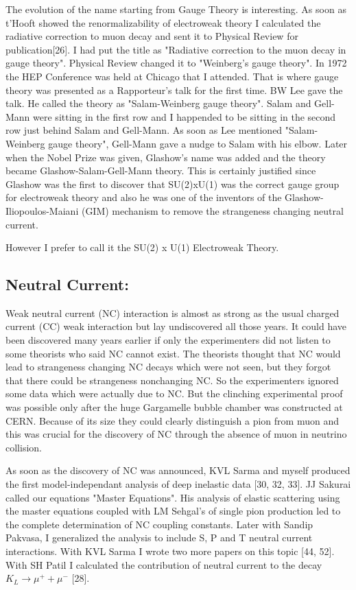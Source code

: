 The evolution of the name starting from Gauge Theory is interesting. As 
soon as t'Hooft showed the renormalizability of electroweak theory I 
calculated the radiative correction to muon decay and sent it to 
Physical Review for publication[26]. I had put the title as "Radiative 
correction to the muon decay in gauge theory". Physical Review changed 
it to "Weinberg's gauge theory". In 1972 the HEP Conference was held at 
Chicago that I attended. That is where gauge theory was presented as a 
Rapporteur's talk for the first time. BW Lee gave the talk. He called 
the theory as "Salam-Weinberg gauge theory". Salam and Gell-Mann were 
sitting in the first row and I happended to be sitting in the second row 
just behind Salam and Gell-Mann. As soon as Lee mentioned 
"Salam-Weinberg gauge theory", Gell-Mann gave a nudge to Salam with his 
elbow. Later when the Nobel Prize was given, Glashow's name was added 
and the theory became Glashow-Salam-Gell-Mann theory. This is certainly 
justified since Glashow was the first to discover that SU(2)xU(1) was 
the correct gauge group for electroweak theory and also he was one of 
the inventors of the Glashow-Iliopoulos-Maiani (GIM) mechanism to remove 
the strangeness changing neutral current.

However I prefer to call it the SU(2) x U(1) Electroweak Theory.

\subsection*{Neutral Current: }

Weak neutral current (NC) interaction is almost as strong as the usual 
charged current (CC) weak interaction but lay undiscovered all those 
years. It could have been discovered many years earlier if only the 
experimenters did not listen to some theorists who said NC cannot exist. 
The theorists thought that NC would lead to strangeness changing NC 
decays which were not seen, but they forgot that there could be 
strangeness nonchanging NC. So the experimenters ignored some data which 
were actually due to NC. But the clinching experimental proof was 
possible only after the huge Gargamelle bubble chamber was constructed 
at CERN. Because of its size they could clearly distinguish a pion from 
muon and this was crucial for the discovery of NC through the absence of 
muon in neutrino collision.

As soon as the discovery of NC was announced, KVL Sarma and myself 
produced the first model-independant analysis of deep inelastic data 
[30, 32, 33]. JJ Sakurai called our equations "Master Equations". His 
analysis of elastic scattering using the master equations coupled with 
LM Sehgal's of single pion production led to the complete determination 
of NC coupling constants. Later with Sandip Pakvasa, I generalized the 
analysis to include S, P and T neutral current interactions. With KVL 
Sarma I wrote two more papers on this topic [44, 52]. With SH Patil I 
calculated the contribution of neutral current to the decay $K_L \rightarrow
\mu^+ + \mu^-$ [28].

